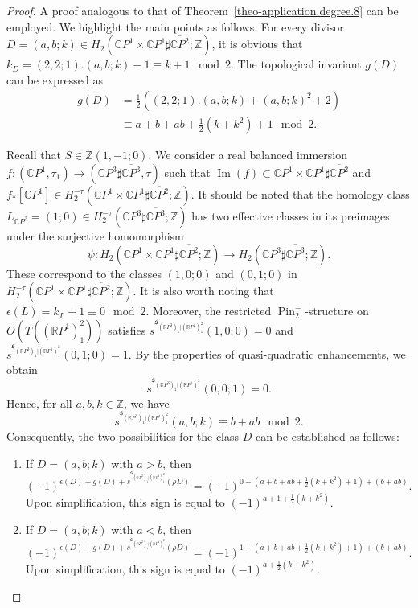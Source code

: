 \documentclass[11pt]{amsart}
\numberwithin{equation}{section}
\theoremstyle{definition}
\theoremstyle{plain}
\theoremstyle{remark}
\newcommand{\R}{\mathbb{R}}
\newcommand{\Z}{\mathbb{Z}}
\newcommand{\C}{\mathbb{C}}
\newcommand{\pp}{\mathbb{C}P^1\times \mathbb{C}P^1}
\DeclareMathOperator{\Pin}{Pin}
\renewcommand{\Im}{\operatorname{Im}}
\newcommand{\lra}{\longrightarrow}
\begin{document}
\begin{proof}
A proof analogous to that of Theorem~\ref{theo-application.degree.8} can be employed. We highlight the main points as follows.  For every divisor $D=(a,b;k)\in H_2(\pp\sharp\overline{\C P^2};\mathbb{Z})$, it is obvious that $k_D=(2,2;1).(a,b;k)-1\equiv k+1 \mod 2$. The topological invariant $g(D)$ can be expressed as 
    \begin{align*}
        g(D)&=\tfrac{1}{2}\left((2,2;1).(a,b;k)+(a,b;k)^2+2\right)\\
        &\equiv a+b+ab+ \tfrac{1}{2}(k + k^2 )+1 \mod 2.
    \end{align*}


    Recall that $S\in \Z(1,-1;0)$. We consider a real balanced immersion $f\colon (\C P^1,\tau_1) \to (\C P^3 \sharp \overline{\C P^3},\tau)$ such that $\Im(f)\subset \pp \sharp \overline{\C P^2}$ and $f_*[\C P^1]\in H_2^{-\tau}(\pp\sharp\overline{\C P^2};\Z)$. It should be noted that the homology class $L_{\C P^3}=(1;0)\in H_2^{-\tau}(\C P^3 \sharp \overline{\C P^3};\Z)$ has two effective classes in its preimages under the surjective homomorphism
    $$\psi\colon H_2\left(\pp\sharp\overline{\C P^2};\Z\right)\lra H_2\left(\C P^3 \sharp \overline{\C P^3};\Z\right).$$
These correspond to the classes $(1,0;0)$ and $(0,1;0)$ in $H_2^{-\tau}(\pp\sharp\overline{\C P^2};\Z)$. It is also worth  noting that $\epsilon(L)=k_L+1 \equiv 0\mod 2$. Moreover, the restricted $\Pin^-_2$-structure  on $O(T ((\R P^1)^2_1))$ satisfies $s^{\mathfrak{s}_{(\R P^3)_1|(\R P^1)^2_1}}(1,0;0)=0$ and  $s^{\mathfrak{s}_{(\R P^3)_1|(\R P^1)^2_1}}(0,1;0)=1$. By the properties of quasi-quadratic enhancements, we obtain $$s^{\mathfrak{s}_{(\R P^3)_1|(\R P^1)^2_1}}(0,0;1)=0.$$
Hence, for all $a,b,k \in \Z$, we have
$$s^{\mathfrak{s}_{(\R P^3)_1|(\R P^1)^2_1}}(a,b;k) 
\equiv b+ab\mod 2.$$
Consequently, the two possibilities for the class $D$ can be established as follows: 
\begin{enumerate}
    \item If $D=(a,b;k)$ with $a>b$, then
$$(-1)^{\epsilon(D)+g(D)+s^{\mathfrak{s}_{(\R P^3)_1|(\R P^1)^2_1}}(\rho D)}=(-1)^{0+(a+b+ab+\frac{1}{2}(k+k^2)+1)+(b+ab)}.$$
Upon simplification, this sign is equal to $(-1)^{a+1+\frac{1}{2}(k+k^2)}$.
    \item If $D=(a,b;k)$ with $a<b$, then
$$(-1)^{\epsilon(D)+g(D)+s^{\mathfrak{s}_{(\R P^3)_1|(\R P^1)^2_1}}(\rho D)}=(-1)^{1+(a+b+ab+\frac{1}{2}(k+k^2)+1)+(b+ab)}.$$
Upon simplification, this sign is equal to $(-1)^{a+\frac{1}{2}(k+k^2)}$.
\end{enumerate}


\end{proof}
\end{document}
